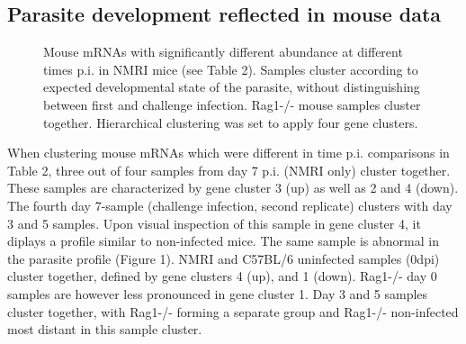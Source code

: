 \documentclass{bmcart}
\begin{document}
\begin{backmatter}
\subsection{Parasite development reflected in mouse data}
\begin{figure}[h!]
\caption{Mouse mRNAs with significantly different abundance at
  different times p.i. in NMRI mice (see Table 2). Samples cluster
  according to expected developmental state of the parasite, without
  distinguishing between first and challenge infection. Rag1-/- mouse
  samples cluster together. Hierarchical clustering was set to apply
  four gene clusters.}
\end{figure}

When clustering mouse mRNAs which were different in time
p.i. comparisons in Table 2, three out of four samples from day 7
p.i. (NMRI only) cluster together. These samples are characterized by
gene cluster 3 (up) as well as 2 and 4 (down). The fourth day 7-sample
(challenge infection, second replicate) clusters with day 3 and 5
samples. Upon visual inspection of this sample in gene cluster 4, it
diplays a profile similar to non-infected mice. The same sample is
abnormal in the parasite profile (Figure 1). NMRI and C57BL/6
uninfected samples (0dpi) cluster together, defined by gene clusters 4
(up), and 1 (down). Rag1-/- day 0 samples are however less pronounced
in gene cluster 1. Day 3 and 5 samples cluster together, with Rag1-/-
forming a separate group and Rag1-/- non-infected most distant in this
sample cluster.





\end{backmatter}
\end{document}

